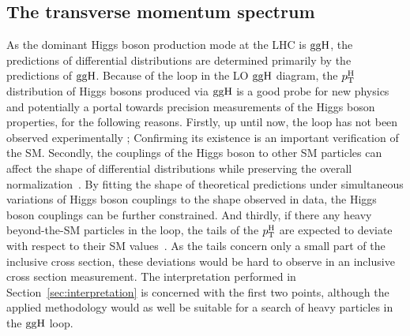\subsection{The transverse momentum spectrum}
\label{sec:theory-pt}


As the dominant Higgs boson production mode at the LHC is $\mathrm{g}\mathrm{g}\mathrm{H}$, the predictions of differential distributions are determined primarily by the predictions of $\mathrm{g}\mathrm{g}\mathrm{H}$.
% 
Because of the loop in the LO $\mathrm{g}\mathrm{g}\mathrm{H}$ diagram, the $p_\mathrm{T}^\mathrm{H}$ distribution of Higgs bosons produced via $\mathrm{g}\mathrm{g}\mathrm{H}$ is a good probe for new physics and potentially a portal towards precision measurements of the Higgs boson properties, for the following reasons.
% 
Firstly, up until now, the loop has not been observed experimentally ; Confirming its existence is an important verification of the SM.
% 
Secondly, the couplings of the Higgs boson to other SM particles can affect the shape of differential distributions while preserving the overall normalization~\cite{Bishara:2016jga,Grazzini:2017szg,Grazzini:2016paz}.
% 
By fitting the shape of theoretical predictions under simultaneous variations of Higgs boson couplings to the shape observed in data, the Higgs boson couplings can be further constrained.
% 
And thirdly, if there any heavy beyond-the-SM particles in the loop, the tails of the $p_\mathrm{T}^\mathrm{H}$ are expected to deviate with respect to their SM values~\cite{Banfi:2013yoa}.
% 
As the tails concern only a small part of the inclusive cross section, these deviations would be hard to observe in an inclusive cross section measurement.
% 
The interpretation performed in Section~\ref{sec:interpretation} is concerned with the first two points, although the applied methodology would as well be suitable for a search of heavy particles in the $\mathrm{g}\mathrm{g}\mathrm{H}$ loop.


